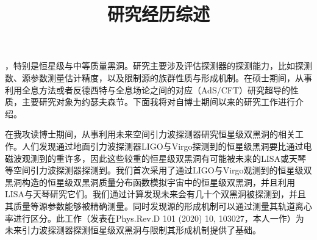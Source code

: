 \documentclass[12pt,a4paper,sans]{article}%
\title{\vspace{-2.5cm}\Huge 研究经历综述 \vspace{-2.2em}}
\date{}
\begin{document}
\begin{CJK}{UTF8}{gbsn}
\maketitle
，特别是恒星级与中等质量黑洞。研究主要涉及评估探测器的探测能力，比如探测数、源参数测量估计精度，以及限制源的族群性质与形成机制。在硕士期间，从事利用全息方法或者反德西特与全息场论之间的对应（AdS/CFT）研究超导的性质，主要研究对象为约瑟夫森节。下面我将对自博士期间以来的研究工作进行介绍。

在我攻读博士期间，从事利用未来空间引力波探测器研究恒星级双黑洞的相关工作。人们发现通过地面引力波探测器LIGO与Virgo探测到的恒星级黑洞要比通过电磁波观测到的重许多，因此这些较重的恒星级双黑洞有可能被未来的LISA或天琴等空间引力波探测器探测到。我们首次采用了通过LIGO与Virgo观测到的恒星级双黑洞构造的恒星级双黑洞质量分布函数模拟宇宙中的恒星级双黑洞，并且利用LISA与天琴研究它们。我们通过计算发现未来会有几十个双黑洞被探测到，并且其质量等源参数能够被精确测量。同时发现源的形成机制可以通过测量其轨道离心率进行区分。此工作（发表在Phys.Rev.D
    101 (2020) 10, 103027，本人一作）为未来引力波探测器探测恒星级双黑洞与限制其形成机制提供了基础。


\end{CJK}
\end{document}
